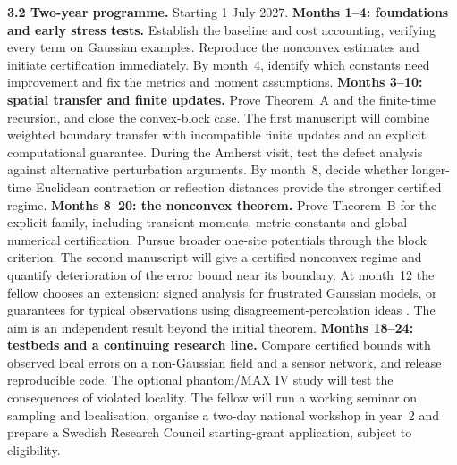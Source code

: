 \documentclass[12pt,a4paper]{article}
\begin{document}
\textbf{3.2 Two-year programme.} Starting 1 July 2027. \textbf{Months 1--4: foundations and early stress tests.} Establish the baseline and cost accounting, verifying every term on Gaussian examples. Reproduce the nonconvex estimates and initiate certification immediately. By month~4, identify which constants need improvement and fix the metrics and moment assumptions.
\textbf{Months 3--10: spatial transfer and finite updates.} Prove Theorem~A and the finite-time recursion, and close the convex-block case. The first manuscript will combine weighted boundary transfer with incompatible finite updates and an explicit computational guarantee. During the Amherst visit, test the defect analysis against alternative perturbation arguments. By month~8, decide whether longer-time Euclidean contraction or reflection distances provide the stronger certified regime.
\textbf{Months 8--20: the nonconvex theorem.} Prove Theorem~B for the explicit family, including transient moments, metric constants and global numerical certification. Pursue broader one-site potentials through the block criterion. The second manuscript will give a certified nonconvex regime and quantify deterioration of the error bound near its boundary. At month~12 the fellow chooses an extension: signed analysis for frustrated Gaussian models, or guarantees for typical observations using disagreement-percolation ideas \cite{vdBM94}. The aim is an independent result beyond the initial theorem.
\textbf{Months 18--24: testbeds and a continuing research line.} Compare certified bounds with observed local errors on a non-Gaussian field and a sensor network, and release reproducible code. The optional phantom/MAX IV study will test the consequences of violated locality. The fellow will run a working seminar on sampling and localisation, organise a two-day national workshop in year~2 and prepare a Swedish Research Council starting-grant application, subject to eligibility.
\end{document}
